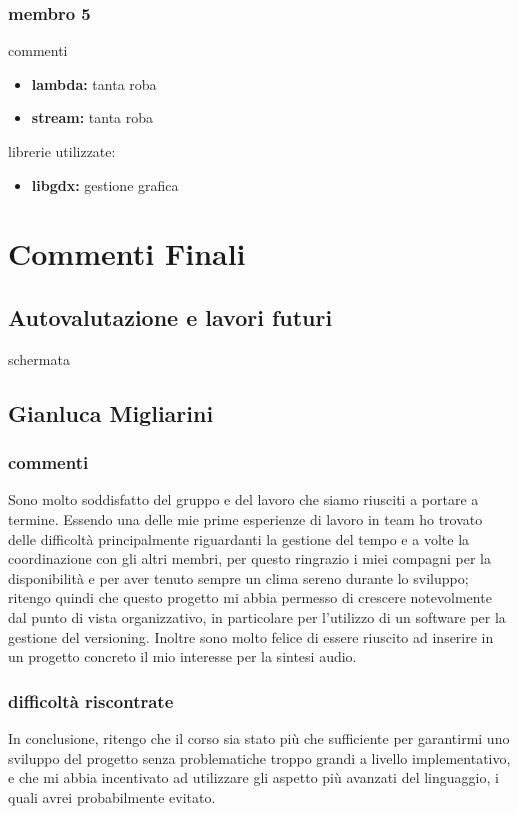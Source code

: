 \documentclass[a4paper,12pt]{report}
\begin{document}
\subsection{membro 5}
commenti
\begin{itemize}
	\item \textbf{lambda:} tanta roba
	\item \textbf{stream:} tanta roba
\end{itemize}
librerie utilizzate:
\begin{itemize}
	\item \textbf{libgdx:} gestione grafica
\end{itemize}
\newpage




\chapter{Commenti Finali}
\section{Autovalutazione e lavori futuri} 
schermata 
\newpage

\section{Gianluca Migliarini}
\subsection{commenti}
Sono molto soddisfatto del gruppo e del lavoro che siamo riusciti a portare a termine.
Essendo una delle mie prime esperienze di lavoro in team ho trovato delle difficoltà principalmente riguardanti
la gestione del tempo e a volte la coordinazione con gli altri membri, per questo ringrazio i miei compagni per la disponibilità e per aver tenuto sempre un clima sereno durante lo sviluppo; ritengo quindi che questo progetto mi abbia permesso di crescere notevolmente dal punto di vista organizzativo, in particolare per l'utilizzo di un software per la gestione del versioning.
Inoltre sono molto felice di essere riuscito ad inserire in un progetto concreto il mio interesse per la sintesi audio.
\subsection{difficoltà riscontrate}
In conclusione, ritengo che il corso sia stato più che sufficiente per garantirmi uno sviluppo del progetto senza problematiche troppo grandi a livello implementativo, e che mi abbia incentivato ad utilizzare gli aspetto più avanzati del linguaggio, i quali avrei probabilmente evitato.
\newpage
\end{document}
